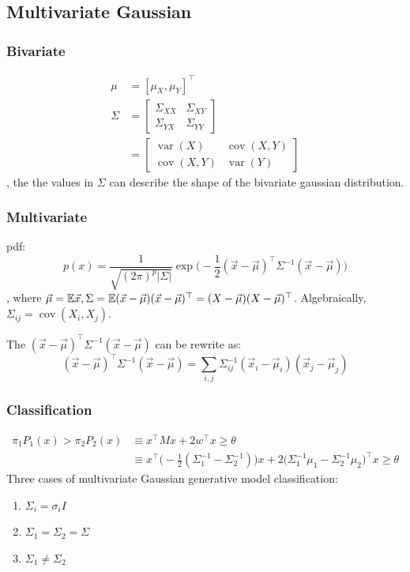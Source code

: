 \documentclass[a4paper]{report}
\begin{document}
\subsection{Multivariate Gaussian}
\subsubsection{Bivariate}
\begin{align*}
\mu &= [\mu_X, \mu_Y]^\top \\
\Sigma &= \begin{bmatrix}
\Sigma_{XX} & \Sigma_{XY} \\
\Sigma_{YX} & \Sigma_{YY} 
\end{bmatrix}\\
&= \begin{bmatrix}
\operatorname{var}(X) & \operatorname{cov}(X,Y) \\
\operatorname{cov}(X,Y) & \operatorname{var}(Y)
\end{bmatrix}
\end{align*}
, the the values in $\Sigma$ can describe the shape of the bivariate gaussian distribution.


\subsubsection{Multivariate}
pdf:
$$
p(x) = \frac{1}{\sqrt{(2\pi)^p|\Sigma|}}\exp\Big(-\frac{1}{2}(\vec x-\vec\mu)^\top\Sigma^{-1}(\vec x-\vec\mu)\Big)
$$
, where $\vec\mu=\mathbb{E} \vec x, \Sigma=\mathbb{E}(\vec x-\vec\mu)(\vec x-\vec\mu)^\top=(X-\vec\mu)(X-\vec\mu)^\top$. Algebraically, $\Sigma_{ij}=\operatorname{cov}(X_i, X_j)$. 

The $(\vec x-\vec\mu)^\top\Sigma^{-1}(\vec x-\vec\mu)$ can be rewrite as: 
$$
(\vec x-\vec\mu)^\top\Sigma^{-1}(\vec x-\vec\mu) = \sum_{i, j} \Sigma^{-1}_{ij} (\vec x_i-\vec \mu_i)(\vec x_j-\vec \mu_j)
$$

\subsubsection{Classification}
\begin{align*}
\pi_1 P_1(x) > \pi_2 P_2(x) &\equiv x^\top Mx+2w^\top x \geq \theta \\
&\equiv x^\top\Big(-\frac{1}{2}(\Sigma_1^{-1}-\Sigma_2^{-1})\Big)x+2\Big(\Sigma_1^{-1}\mu_1-\Sigma_2^{-1}\mu_2\Big)^\top x \geq \theta
\end{align*}
Three cases of multivariate Gaussian generative model classification: 
\begin{enumerate}
\item $\Sigma_i = \sigma_i I$
\item $\Sigma_1=\Sigma_2=\Sigma$
\item $\Sigma_1 \neq \Sigma_2$
\end{enumerate}
\end{document}
